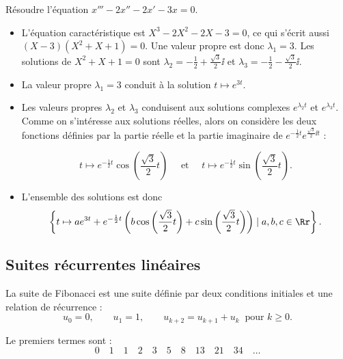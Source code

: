 \documentclass[12pt, class=report,crop=false]{standalone}
\begin{document}
\begin{exemple}
Résoudre l'équation $x''' - 2x'' -2x' -3x=0$.

\begin{itemize}
  \item L'équation caractéristique est $X^3 - 2X^2 - 2X - 3=0$, ce qui s'écrit aussi
$(X-3)(X^2+X+1)=0$.
Une valeur propre est donc $\lambda_1 = 3$.
Les solutions de $X^2+X+1=0$ sont 
$\lambda_2 = -\frac12 + \frac{\sqrt3}{2}\ii$ et $\lambda_3 = -\frac12 - \frac{\sqrt3}{2}\ii$.

 
  \item La valeur propre $\lambda_1 = 3$ conduit à la solution
  $t \mapsto e^{3t}$.

  \item Les valeurs propres $\lambda_2$ et $\lambda_3$ conduisent aux solutions complexes $e^{\lambda_2t}$ et $e^{\lambda_3t}$. Comme on s'intéresse aux solutions réelles, alors on considère les deux fonctions définies par la partie réelle et la partie imaginaire 
  de $e^{-\frac12t}e^{\frac{\sqrt3}{2}\ii t}$ :
   
 $$t \mapsto e^{-\frac12t} \cos\left(\frac{\sqrt3}{2}t\right) 
 \quad \text{ et } \quad
 t \mapsto e^{-\frac12t} \sin\left(\frac{\sqrt3}{2}t\right).$$ 
  
  \item L'ensemble des solutions est donc
  $$\left\{ t \mapsto ae^{3t} + e^{-\frac12t} \left( b\cos\left(\frac{\sqrt3}{2}t\right) 
  + c \sin\left(\frac{\sqrt3}{2}t\right)\right)  \mid a,b,c \in \Rr \right\}.$$
\end{itemize}
\end{exemple}

 
\subsection{Suites récurrentes linéaires}

La suite de Fibonacci est une suite définie par deux conditions initiales et une relation de récurrence :
$$u_0 = 0, \qquad u_1 = 1, \qquad u_{k+2} = u_{k+1}+u_{k} \ \text{ pour } k \ge 0.$$

Le premiers termes sont :
$$0 \quad 1 \quad 1 \quad 2 \quad 3 \quad 5 \quad 8 \quad 13 \quad 21 \quad 34 \quad \ldots$$
\end{document}
